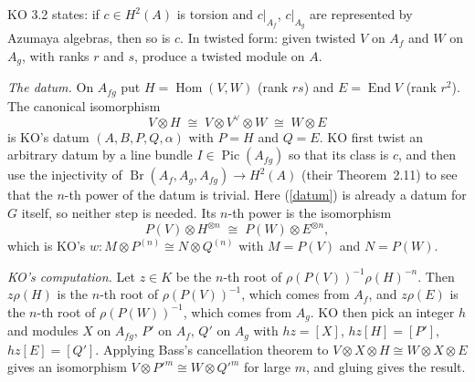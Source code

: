 \documentclass[11pt]{amsart}
\theoremstyle{definition}
\theoremstyle{remark}
\newcommand{\Hom}{\operatorname{Hom}}
\newcommand{\End}{\operatorname{End}}
\begin{document}
KO 3.2 states: if $c\in H^2(A)$ is torsion and $c|_{A_f}$, $c|_{A_g}$ are
represented by Azumaya algebras, then so is $c$. In twisted form: given
twisted $V$ on $A_f$ and $W$ on $A_g$, with ranks $r$ and $s$, produce a
twisted module on $A$.

\smallskip\noindent\emph{The datum.} On $A_{fg}$ put $H=\Hom(V,W)$ (rank
$rs$) and $E=\End V$ (rank $r^2$). The canonical isomorphism
\begin{equation}\label{datum}
V\otimes H\;\cong\; V\otimes V^\vee\otimes W\;\cong\; W\otimes E
\end{equation}
is KO's datum $(A,B,P,Q,\alpha)$ with $P=H$ and $Q=E$. KO first twist an
arbitrary datum by a line bundle $I\in\operatorname{Pic}(A_{fg})$ so that its
class is $c$, and then use the injectivity of
$\operatorname{Br}(A_f,A_g,A_{fg})\to H^2(A)$ (their Theorem~2.11) to see that
the $n$-th power of the datum is trivial. Here (\ref{datum}) is already a
datum for $G$ itself, so neither step is needed. Its $n$-th power is the
isomorphism
\begin{equation}\label{w}
P(V)\otimes H^{\otimes n}\;\cong\;P(W)\otimes E^{\otimes n},
\end{equation}
which is KO's $w: M\otimes P^{(n)}\cong N\otimes Q^{(n)}$ with $M=P(V)$ and
$N=P(W)$.

\smallskip\noindent\emph{KO's computation.} Let $z\in K$ be the $n$-th root
of $\rho(P(V))^{-1}\rho(H)^{-n}$. Then $z\rho(H)$ is the $n$-th root of
$\rho(P(V))^{-1}$, which comes from $A_f$, and $z\rho(E)$ is the $n$-th root
of $\rho(P(W))^{-1}$, which comes from $A_g$. KO then pick an integer $h$ and
modules $X$ on $A_{fg}$, $P'$ on $A_f$, $Q'$ on $A_g$ with $hz=[X]$,
$hz[H]=[P']$, $hz[E]=[Q']$. Applying Bass's cancellation theorem to
$V\otimes X\otimes H\cong W\otimes X\otimes E$ gives an isomorphism $V\otimes
P'^m\cong W\otimes Q'^m$ for large $m$, and gluing gives the result.
\end{document}
